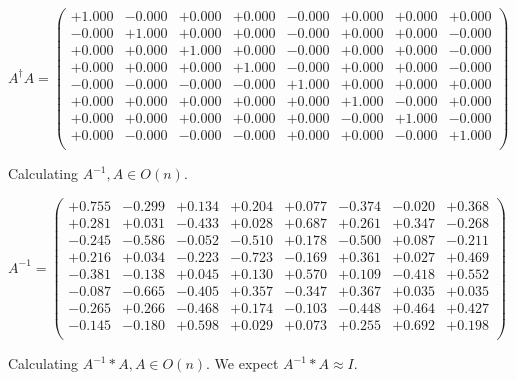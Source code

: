 \documentclass[9pt]{article}
\theoremstyle{plain}
\theoremstyle{definition}
\theoremstyle{remark}
\numberwithin{equation}{section}
\begin{document}
$A^{\dag} A = \left(
\begin{array}{
cccccccc}
+1.000 & -0.000 & +0.000 & +0.000 & -0.000 & +0.000 & +0.000 & +0.000 \\
-0.000 & +1.000 & +0.000 & +0.000 & -0.000 & +0.000 & +0.000 & -0.000 \\
+0.000 & +0.000 & +1.000 & +0.000 & -0.000 & +0.000 & +0.000 & -0.000 \\
+0.000 & +0.000 & +0.000 & +1.000 & -0.000 & +0.000 & +0.000 & -0.000 \\
-0.000 & -0.000 & -0.000 & -0.000 & +1.000 & +0.000 & +0.000 & +0.000 \\
+0.000 & +0.000 & +0.000 & +0.000 & +0.000 & +1.000 & -0.000 & +0.000 \\
+0.000 & +0.000 & +0.000 & +0.000 & +0.000 & -0.000 & +1.000 & -0.000 \\
+0.000 & -0.000 & -0.000 & -0.000 & +0.000 & +0.000 & -0.000 & +1.000 \\
\end{array}
\right)$ \newline 

Calculating $A^{-1} ,  A \in O(n)$.

$A^{-1} = \left(
\begin{array}{
cccccccc}
+0.755 & -0.299 & +0.134 & +0.204 & +0.077 & -0.374 & -0.020 & +0.368 \\
+0.281 & +0.031 & -0.433 & +0.028 & +0.687 & +0.261 & +0.347 & -0.268 \\
-0.245 & -0.586 & -0.052 & -0.510 & +0.178 & -0.500 & +0.087 & -0.211 \\
+0.216 & +0.034 & -0.223 & -0.723 & -0.169 & +0.361 & +0.027 & +0.469 \\
-0.381 & -0.138 & +0.045 & +0.130 & +0.570 & +0.109 & -0.418 & +0.552 \\
-0.087 & -0.665 & -0.405 & +0.357 & -0.347 & +0.367 & +0.035 & +0.035 \\
-0.265 & +0.266 & -0.468 & +0.174 & -0.103 & -0.448 & +0.464 & +0.427 \\
-0.145 & -0.180 & +0.598 & +0.029 & +0.073 & +0.255 & +0.692 & +0.198 \\
\end{array}
\right)$ \newline 

Calculating $A^{-1} *A  ,  A \in O(n)$.   We expect $A^{-1} *A  \approx I$. 
\end{document}

